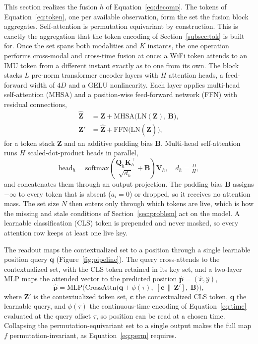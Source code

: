 \noindent
This section realizes the fusion $h$ of Equation~\eqref{eq:decomp}. The tokens of
Equation~\eqref{eq:token}, one per available observation, form the set the fusion
block aggregates. Self-attention is permutation equivariant by construction. This
is exactly the aggregation that the token encoding of Section~\ref{subsec:tok} is
built for. Once the set spans both modalities and $K$ instants, the one operation
performs cross-modal and cross-time fusion at once: a WiFi token attends to an IMU
token from a different instant exactly as to one from its own. The block stacks
$L$ pre-norm transformer encoder layers with $H$ attention heads, a feed-forward
width of $4D$ and a GELU nonlinearity. Each layer applies multi-head self-attention
(MHSA) and a position-wise feed-forward network (FFN) with residual connections,
\begin{equation}\label{eq:layer}
  \begin{aligned}
    \hat{\mathbf{Z}} &= \mathbf{Z}
      + \mathrm{MHSA}\big(\mathrm{LN}(\mathbf{Z}),\, \mathbf{B}\big), \\
    \mathbf{Z}' &= \hat{\mathbf{Z}}
      + \mathrm{FFN}\big(\mathrm{LN}(\hat{\mathbf{Z}})\big),
  \end{aligned}
\end{equation}
for a token stack $\mathbf{Z}$ and an additive padding bias $\mathbf{B}$.
Multi-head self-attention runs $H$ scaled-dot-product heads in parallel,
\begin{equation}\label{eq:mhsa}
  \mathrm{head}_h = \mathrm{softmax}\!\left(
    \frac{\mathbf{Q}_h \mathbf{K}_h^{\!\top}}{\sqrt{d_h}} + \mathbf{B}
  \right)\mathbf{V}_h,
  \quad d_h = \tfrac{D}{H},
\end{equation}
and concatenates them through an output projection. The padding bias $\mathbf{B}$
assigns $-\infty$ to every token that is absent ($a_i=0$) or dropped, so it
receives no attention mass. The set size $N$ then enters only through which tokens
are live, which is how the missing and stale conditions of
Section~\ref{sec:problem} act on the model. A learnable classification (CLS) token
is prepended and never masked, so every attention row keeps at least one live key.

The readout maps the contextualized set to a position through a single learnable
position query $\mathbf{q}$ (Figure~\ref{fig:pipeline}). The query cross-attends
to the contextualized set, with the CLS token retained in its key set, and a
two-layer MLP maps the attended vector to the predicted position
$\hat{\mathbf{p}} = (\hat{x},\hat{y})$,
\begin{equation}\label{eq:readout}
  \hat{\mathbf{p}} = \mathrm{MLP}\!\Big(
    \mathrm{CrossAttn}\big(\mathbf{q} + \phi(\tau),\; [\mathbf{c}\,\|\,\mathbf{Z}'],\; \mathbf{B}\big)
  \Big),
\end{equation}
where $\mathbf{Z}'$ is the contextualized token set, $\mathbf{c}$ the
contextualized CLS token, $\mathbf{q}$ the learnable query, and $\phi(\tau)$ the
continuous-time encoding of Equation~\eqref{eq:time} evaluated at the query offset
$\tau$, so position can be read at a chosen time. Collapsing the
permutation-equivariant set to a single output makes the full map $f$
permutation-invariant, as Equation~\eqref{eq:perm} requires.

